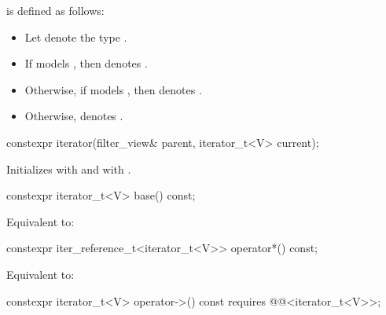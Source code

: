 \pnum
{} is defined as follows:
\begin{itemize}
\item Let  denote the type
.

\item If  models ,
then  denotes .

\item Otherwise, if   models ,
then  denotes .

\item Otherwise,  denotes .
\end{itemize}

%
\begin{itemdecl}
constexpr iterator(filter_view& parent, iterator_t<V> current);
\end{itemdecl}

\begin{itemdescr}
\pnum
\effects Initializes  with  and
 with .
\end{itemdescr}

%
\begin{itemdecl}
constexpr iterator_t<V> base() const;
\end{itemdecl}

\begin{itemdescr}
\pnum
\effects Equivalent to: 
\end{itemdescr}

%
\begin{itemdecl}
constexpr iter_reference_t<iterator_t<V>> operator*() const;
\end{itemdecl}

\begin{itemdescr}
\pnum
\effects Equivalent to: 
\end{itemdescr}

%
\begin{itemdecl}
constexpr iterator_t<V> operator->() const
  requires @@<iterator_t<V>>;
\end{itemdecl}

